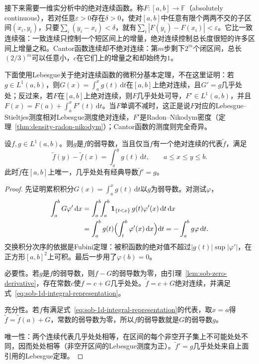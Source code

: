 接下来需要一维实分析中的绝对连续函数。称$F:[a,b]\to\mathbb F$（absolutely continuous），若对任意$\varepsilon>0$存在$\delta>0$，使对$[a,b]$中任意有限个两两不交的子区间$(x_i,y_i)$，只要$\sum_i(y_i-x_i)<\delta$，就有$\sum_i|F(y_i)-F(x_i)|<\varepsilon$。它比一致连续强：一致连续只控制一个短区间上的增量，绝对连续控制总长度很短的许多区间上增量之和。Cantor函数连续却不绝对连续：第$m$步剩下$2^m$个闭区间，总长$(2/3)^m$可以任意小，$c$在它们上的增量之和却始终为$1$。

下面使用Lebesgue关于绝对连续函数的微积分基本定理，不在这里证明：若$g\in L^1(a,b)$，则$G(x)=\int_a^xg(t)\,\mathrm dt$在$[a,b]$上绝对连续，且$G'=g$几乎处处；反过来，若$F$在$[a,b]$上绝对连续，则$F$几乎处处可导，$F'\in L^1(a,b)$，并且$F(x)=F(a)+\int_a^xF'(t)\,\mathrm dt$。当$F$单调不减时，这正是说$F$对应的Lebesgue--Stieltjes测度相对Lebesgue测度绝对连续，$F'$是Radon--Nikodym密度（定理~\ref{thm:density-radon-nikodym}）；Cantor函数的测度则完全奇异。

\begin{theorem}[一维弱导数与绝对连续代表]
\label{thm:sob-1d-absolute-continuity}
设$f,g\in L^1(a,b)$。则$g$是$f$的弱导数，当且仅当$f$有一个绝对连续的代表$\tilde f$，满足
\begin{equation}
 \tilde f(y)-\tilde f(x)=\int_x^yg(t)\,\mathrm dt,\qquad a\le x\le y\le b .
 \label{eq:sob-1d-integral-representation}
\end{equation}
此时$\tilde f$在$[a,b]$上唯一，几乎处处有经典导数$\tilde f'=g$。
\end{theorem}

\begin{proof}
先证明累积积分$G(x)=\int_a^xg(t)\,\mathrm dt$以$g$为弱导数。对测试$\varphi$，
\[
 \begin{aligned}
 \int_a^bG\varphi'\,\mathrm dx&=\int_a^b\!\!\int_a^b\mathbf 1_{\{t<x\}}\,g(t)\varphi'(x)\,\mathrm dt\,\mathrm dx\\
 &=\int_a^bg(t)\Bigl(\int_t^b\varphi'(x)\,\mathrm dx\Bigr)\mathrm dt=-\int_a^bg\varphi\,\mathrm dt .
 \end{aligned}
\]
交换积分次序的依据是Fubini定理：被积函数的绝对值不超过$|g(t)|\sup|\varphi'|$，在正方形$[a,b]^2$上可积。最后一步用了$\varphi(b)=0$。

必要性。若$g$是$f$的弱导数，则$f-G$的弱导数为零，由引理~\ref{lem:sob-zero-derivative}，存在常数$c$使$f=c+G$几乎处处。$\tilde f=c+G$绝对连续，并满足式~\eqref{eq:sob-1d-integral-representation}。

充分性。若$f$有满足式~\eqref{eq:sob-1d-integral-representation}的代表，取$x=a$得$\tilde f=\tilde f(a)+G$，常数的弱导数为零，所以$f$的弱导数就是$G$的弱导数$g$。

唯一性：两个连续代表几乎处处相等，在区间的每个非空开子集上不可能处处不同，因而处处相等（非空开区间的Lebesgue测度为正）。$\tilde f'=g$几乎处处来自上面引用的Lebesgue定理。
\end{proof}

